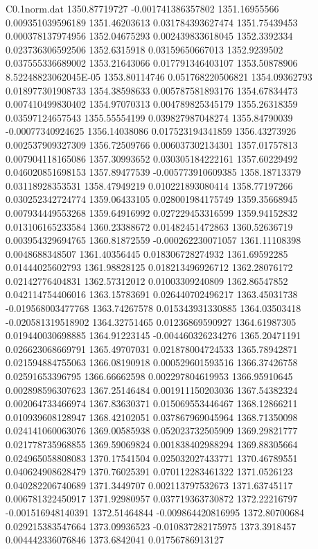 \begin{filecontents}{C0.1norm.dat}
1350.87719727		-0.001741386357802
1351.16955566		0.009351039596189
1351.46203613		0.031784393627474
1351.75439453		0.000378137974956
1352.04675293		0.002439833618045
1352.3392334		0.023736306592506
1352.6315918		0.03159650667013
1352.9239502		0.037555336689002
1353.21643066		0.017791346403107
1353.50878906		8.52248823062045E-05
1353.80114746		0.051768220506821
1354.09362793		0.018977301908733
1354.38598633		0.005787581893176
1354.67834473		0.007410499830402
1354.97070313		0.004789825345179
1355.26318359		0.03597124657543
1355.55554199		0.039827987048274
1355.84790039		-0.00077340924625
1356.14038086		0.017523194341859
1356.43273926		0.002537909327309
1356.72509766		0.006037302134301
1357.01757813		0.007904118165086
1357.30993652		0.030305184222161
1357.60229492		0.046020851698153
1357.89477539		-0.005773910609385
1358.18713379		0.03118928353531
1358.47949219		0.010221893080414
1358.77197266		0.030252342724774
1359.06433105		0.028001984175749
1359.35668945		0.007934449553268
1359.64916992		0.027229453316599
1359.94152832		0.013106165233584
1360.23388672		0.01482451472863
1360.52636719		0.003954329694765
1360.81872559		-0.000262230071057
1361.11108398		0.0048688348507
1361.40356445		0.018306728274932
1361.69592285		0.01444025602793
1361.98828125		0.018213496926712
1362.28076172		0.02142776404831
1362.57312012		0.01003309240809
1362.86547852		0.042114754406016
1363.15783691		0.026440702496217
1363.45031738		-0.019568003477768
1363.74267578		0.015343931330885
1364.03503418		-0.020581319518902
1364.32751465		0.01236869590927
1364.61987305		0.019440030698885
1364.91223145		-0.004460326234276
1365.20471191		0.026623068669791
1365.49707031		0.021878004724533
1365.78942871		0.021594884755063
1366.08190918		0.000529601593516
1366.37426758		0.02591653396795
1366.66662598		0.002297804619953
1366.95910645		0.002898596307623
1367.25146484		0.001911150203036
1367.54382324		0.002064733466974
1367.83630371		0.015069553446467
1368.12866211		0.010939608128947
1368.42102051		0.037867969045964
1368.71350098		0.024141060063076
1369.00585938		0.052023732505909
1369.29821777		0.021778735968855
1369.59069824		0.001838402988294
1369.88305664		0.024965058808083
1370.17541504		0.025032027433771
1370.46789551		0.040624908628479
1370.76025391		0.070112283461322
1371.0526123		0.040282206740689
1371.3449707		0.002113797532673
1371.63745117		0.006781322450917
1371.92980957		0.037719363730872
1372.22216797		-0.001516948140391
1372.51464844		-0.009864420816995
1372.80700684		0.029215383547664
1373.09936523		-0.010837282175975
1373.3918457		0.004442336076846
1373.6842041		0.01756786913127

\end{filecontents}
